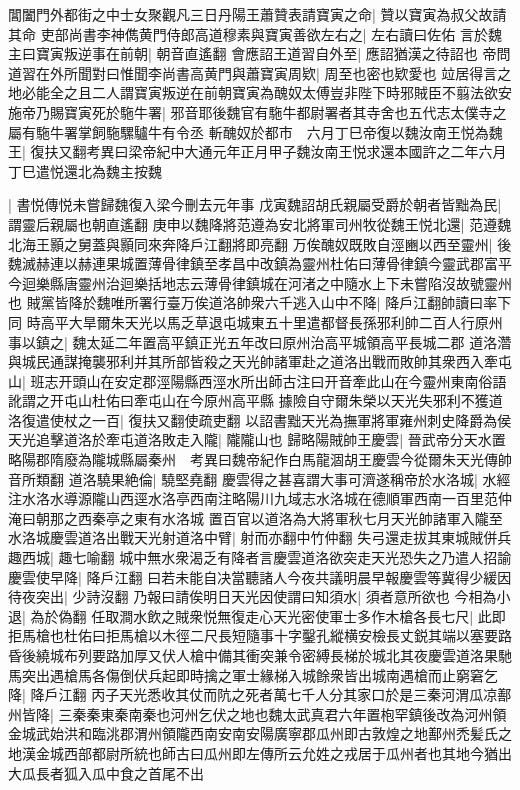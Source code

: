 閶闔門外都街之中士女聚觀凡三日丹陽王蕭贊表請寶寅之命|{
	贊以寶寅為叔父故請其命}
吏部尚書李神儁黄門侍郎高道穆素與寶寅善欲左右之|{
	左右讀曰佐佑}
言於魏主曰寶寅叛逆事在前朝|{
	朝音直遙翻}
會應詔王道習自外至|{
	應詔猶漢之待詔也}
帝問道習在外所聞對曰惟聞李尚書高黄門與蕭寶寅周欵|{
	周至也密也欵愛也}
竝居得言之地必能全之且二人謂寶寅叛逆在前朝寶寅為醜奴太傅豈非陛下時邪賊臣不翦法欲安施帝乃賜寶寅死於駞牛署|{
	邪音耶後魏官有駞牛都尉署者其寺舍也五代志太僕寺之屬有駞牛署掌飼駞騾驢牛有令丞}
斬醜奴於都市　六月丁巳帝復以魏汝南王悦為魏王|{
	復扶又翻考異曰梁帝紀中大通元年正月甲子魏汝南王悦求還本國許之二年六月丁巳遣悦還北為魏主按魏}


|{
	書悦傳悦未嘗歸魏復入梁今刪去元年事}
戊寅魏詔胡氏親屬受爵於朝者皆黜為民|{
	謂靈后親屬也朝直遙翻}
庚申以魏降將范遵為安北將軍司州牧從魏王悦北還|{
	范遵魏北海王顥之舅蓋與顥同來奔降戶江翻將即亮翻}
万俟醜奴既敗自涇豳以西至靈州|{
	後魏滅赫連以赫連果城置薄骨律鎮至孝昌中改鎮為靈州杜佑曰薄骨律鎮今靈武郡富平今迴樂縣唐靈州治迴樂括地志云薄骨律鎮城在河渚之中隨水上下未嘗陷沒故號靈州也}
賊黨皆降於魏唯所署行臺万俟道洛帥衆六千逃入山中不降|{
	降戶江翻帥讀曰率下同}
時高平大旱爾朱天光以馬乏草退屯城東五十里遣都督長孫邪利帥二百人行原州事以鎮之|{
	魏太延二年置高平鎮正光五年改曰原州治高平城領高平長城二郡}
道洛濳與城民通謀掩襲邪利并其所部皆殺之天光帥諸軍赴之道洛出戰而敗帥其衆西入牽屯山|{
	班志开頭山在安定郡涇陽縣西涇水所出師古注曰开音牽此山在今靈州東南俗語訛謂之开屯山杜佑曰牽屯山在今原州高平縣}
據險自守爾朱榮以天光失邪利不獲道洛復遣使杖之一百|{
	復扶又翻使疏吏翻}
以詔書黜天光為撫軍將軍雍州刺史降爵為侯天光追擊道洛於牽屯道洛敗走入隴|{
	隴隴山也}
歸略陽賊帥王慶雲|{
	晉武帝分天水置略陽郡隋廢為隴城縣屬秦州　考異曰魏帝紀作白馬龍涸胡王慶雲今從爾朱天光傳帥音所類翻}
道洛驍果絶倫|{
	驍堅堯翻}
慶雲得之甚喜謂大事可濟遂稱帝於水洛城|{
	水經注水洛水導源隴山西逕水洛亭西南注略陽川九域志水洛城在德順軍西南一百里范仲淹曰朝那之西秦亭之東有水洛城}
置百官以道洛為大將軍秋七月天光帥諸軍入隴至水洛城慶雲道洛出戰天光射道洛中臂|{
	射而亦翻中竹仲翻}
失弓還走拔其東城賊併兵趣西城|{
	趣七喻翻}
城中無水衆渴乏有降者言慶雲道洛欲突走天光恐失之乃遣人招諭慶雲使早降|{
	降戶江翻}
曰若未能自决當聽諸人今夜共議明晨早報慶雲等冀得少緩因待夜突出|{
	少詩沒翻}
乃報曰請俟明日天光因使謂曰知須水|{
	須者意所欲也}
今相為小退|{
	為於偽翻}
任取澗水飲之賊衆悦無復走心天光密使軍士多作木槍各長七尺|{
	此即拒馬槍也杜佑曰拒馬槍以木徑二尺長短隨事十字鑿孔縱横安檢長丈鋭其端以塞要路}
昏後繞城布列要路加厚又伏人槍中備其衝突兼令密縛長梯於城北其夜慶雲道洛果馳馬突出遇槍馬各傷倒伏兵起即時擒之軍士緣梯入城餘衆皆出城南遇槍而止窮窘乞降|{
	降戶江翻}
丙子天光悉收其仗而阬之死者萬七千人分其家口於是三秦河渭瓜凉鄯州皆降|{
	三秦秦東秦南秦也河州乞伏之地也魏太武真君六年置枹罕鎮後改為河州領金城武始洪和臨洮郡渭州領隴西南安南安陽廣寧郡瓜州即古敦煌之地鄯州禿髪氏之地漢金城西部都尉所統也師古曰瓜州即左傳所云允姓之戎居于瓜州者也其地今猶出大瓜長者狐入瓜中食之首尾不出}
